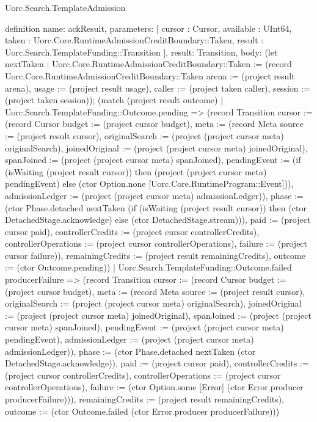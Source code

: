 \begin{lexlean}{Uorc.Search.TemplateAdmission}
\begin{semanticmodule}
definition{
  name: ackResult,
  parameters: [
    cursor : Cursor,
    available : UInt64,
    taken : Uorc.Core.RuntimeAdmissionCreditBoundary::Taken,
    result : Uorc.Search.TemplateFunding::Transition
  ],
  result: Transition,
  body: (let nextTaken : Uorc.Core.RuntimeAdmissionCreditBoundary::Taken := (record Uorc.Core.RuntimeAdmissionCreditBoundary::Taken {arena := (project result arena), usage := (project result usage), caller := (project taken caller), session := (project taken session)}); (match (project result outcome)
    | Uorc.Search.TemplateFunding::Outcome.pending => (record Transition {cursor := (record Cursor {budget := (project cursor budget), meta := (record Meta {source := (project result cursor), originalSearch := (project (project cursor meta) originalSearch), joinedOriginal := (project (project cursor meta) joinedOriginal), spanJoined := (project (project cursor meta) spanJoined), pendingEvent := (if (isWaiting (project result cursor)) then (project (project cursor meta) pendingEvent) else (ctor Option.none [Uorc.Core.RuntimeProgram::Event])), admissionLedger := (project (project cursor meta) admissionLedger)}), phase := (ctor Phase.detached nextTaken (if (isWaiting (project result cursor)) then (ctor DetachedStage.acknowledge) else (ctor DetachedStage.stream))), paid := (project cursor paid), controllerCredits := (project cursor controllerCredits), controllerOperations := (project cursor controllerOperations), failure := (project cursor failure)}), remainingCredits := (project result remainingCredits), outcome := (ctor Outcome.pending)})
    | Uorc.Search.TemplateFunding::Outcome.failed producerFailure => (record Transition {cursor := (record Cursor {budget := (project cursor budget), meta := (record Meta {source := (project result cursor), originalSearch := (project (project cursor meta) originalSearch), joinedOriginal := (project (project cursor meta) joinedOriginal), spanJoined := (project (project cursor meta) spanJoined), pendingEvent := (project (project cursor meta) pendingEvent), admissionLedger := (project (project cursor meta) admissionLedger)}), phase := (ctor Phase.detached nextTaken (ctor DetachedStage.acknowledge)), paid := (project cursor paid), controllerCredits := (project cursor controllerCredits), controllerOperations := (project cursor controllerOperations), failure := (ctor Option.some [Error] (ctor Error.producer producerFailure))}), remainingCredits := (project result remainingCredits), outcome := (ctor Outcome.failed (ctor Error.producer producerFailure))})
}
\end{semanticmodule}
\end{lexlean}
